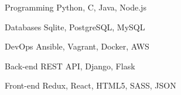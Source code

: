 

\begin{cvskills}

  \cvskill
    {Programming} %
    {Python, C, Java, Node.js} %

  \cvskill
    {Databases} %
    {Sqlite, PostgreSQL, MySQL} %

  \cvskill
    {DevOps} %
    {Ansible, Vagrant, Docker, AWS} %

  \cvskill
    {Back-end} %
    {REST API, Django, Flask} %

  \cvskill
    {Front-end} %
    {Redux, React, HTML5, SASS, JSON} %


\end{cvskills}

